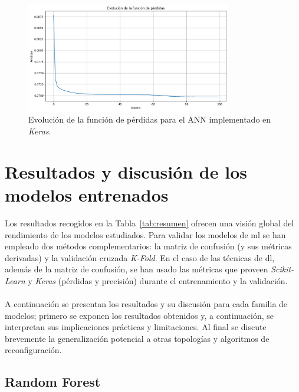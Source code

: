 \begin{figure}[H]
\centering
\includegraphics[width=0.8\textwidth]{fig/06_fault_sg/fault_sg_17.png}
\caption{Evolución de la función de pérdidas para el ANN implementado en \textit{Keras}.}
\label{fig:fault_sg_17}
\end{figure}



\section{Resultados y discusión de los modelos entrenados} 

Los resultados recogidos en la Tabla~\ref{tab:resumen} ofrecen una visión global del rendimiento de los modelos estudiados. Para validar los modelos de \gls{ml} se han empleado dos métodos complementarios: la matriz de confusión (y sus métricas derivadas) y la validación cruzada \emph{K-Fold}. En el caso de las técnicas de \gls{dl}, además de la matriz de confusión, se han usado las métricas que proveen \textit{Scikit-Learn} y \textit{Keras} (pérdidas y precisión) durante el entrenamiento y la validación.\\
\\
A continuación se presentan los resultados y su discusión para cada familia de modelos; primero se exponen los resultados obtenidos y, a continuación, se interpretan sus implicaciones prácticas y limitaciones. Al final se discute brevemente la generalización potencial a otras topologías y algoritmos de reconfiguración.

\subsection{Random Forest} 

